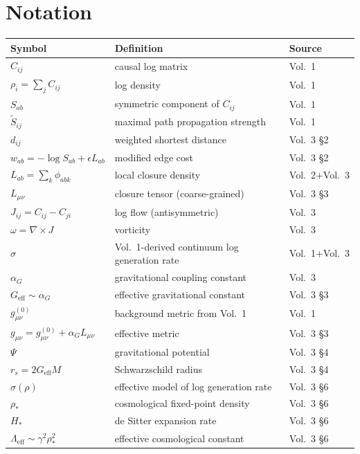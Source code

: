 \section{Notation}
\label{sec:notation}

\begin{center}
\begin{tabular}{lll}
\toprule
Symbol & Definition & Source \\
\midrule
$C_{ij}$ & causal log matrix & Vol.~1 \\
$\rho_i = \sum_j C_{ij}$ & log density & Vol.~1 \\
$S_{ab}$ & symmetric component of $C_{ij}$ & Vol.~1 \\
$\tilde{S}_{ij}$ & maximal path propagation strength & Vol.~1 \\
$d_{ij}$ & weighted shortest distance & Vol.~3 §2 \\
$w_{ab} = -\log S_{ab} + \epsilon L_{ab}$ & modified edge cost & Vol.~3 §2 \\
$L_{ab} = \sum_k\phi_{abk}$ & local closure density & Vol.~2+Vol.~3 \\
$L_{\mu\nu}$ & closure tensor (coarse-grained) & Vol.~3 §3 \\
$J_{ij} = C_{ij}-C_{ji}$ & log flow (antisymmetric) & Vol.~3 \\
$\omega = \nabla\times J$ & vorticity & Vol.~3 \\
$\sigma$ & Vol.~1-derived continuum log generation rate & Vol.~1+Vol.~3 \\
$\alpha_G$ & gravitational coupling constant & Vol.~3 \\
$G_{\text{eff}} \sim \alpha_G$ & effective gravitational constant & Vol.~3 §3 \\
$g^{(0)}_{\mu\nu}$ & background metric from Vol.~1 & Vol.~1 \\
$g_{\mu\nu} = g^{(0)}_{\mu\nu} + \alpha_G L_{\mu\nu}$ & effective metric & Vol.~3 §3 \\
$\Psi$ & gravitational potential & Vol.~3 §4 \\
$r_s = 2G_{\text{eff}}M$ & Schwarzschild radius & Vol.~3 §4 \\
$\sigma(\rho)$ & effective model of log generation rate & Vol.~3 §6 \\
$\rho_*$ & cosmological fixed-point density & Vol.~3 §6 \\
$H_*$ & de Sitter expansion rate & Vol.~3 §6 \\
$\Lambda_{\text{eff}} \sim \gamma^2\rho_*^2$ & effective cosmological constant & Vol.~3 §6 \\
\bottomrule
\end{tabular}
\end{center}

